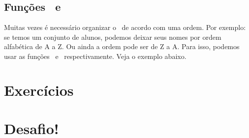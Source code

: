 
\subsection{Funções \funcaosort~e \funcaorsort}
\label{funcoes-sort-e-rsort}

Muitas vezes é necessário organizar o \tipoarray~de acordo com uma ordem. Por exemplo:
se temos um conjunto de alunos, podemos deixar seus nomes por ordem alfabética de A a Z.
Ou ainda a ordem pode ser de Z a A. Para isso, podemos usar as funções \funcaosort~e
\funcaorsort~respectivamente. Veja o exemplo abaixo.




\section{Exercícios}
\label{cap6-exercicios}

\section{Desafio!}
\label{cap6-desafio}